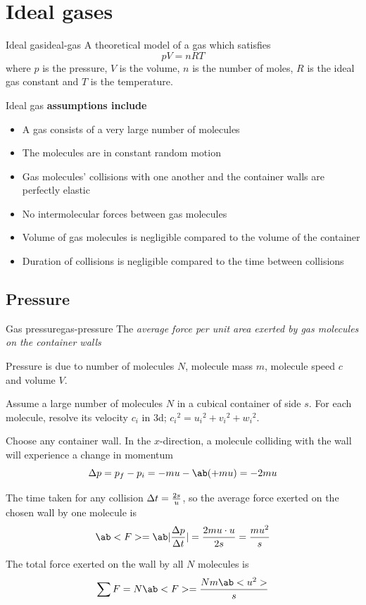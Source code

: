 \section{Ideal gases}
\begin{definition}{Ideal gas}{ideal-gas}
	A theoretical model of a gas which satisfies
	\[pV = nRT\]
	where \(p\) is the pressure, \(V\) is the volume, \(n\) is the number of moles, \(R\) is the ideal gas constant and \(T\) is the temperature.
\end{definition}
Ideal gas \bf{assumptions} include
\begin{itemize}
	\item A gas consists of a very large number of molecules
	\item The molecules are in constant random motion
	\item Gas molecules' collisions with one another and the container walls are perfectly elastic
	\item No intermolecular forces between gas molecules
	\item Volume of gas molecules is negligible compared to the volume of the container
	\item Duration of collisions is negligible compared to the time between collisions
\end{itemize}
\subsection{Pressure}
\begin{definition}{Gas pressure}{gas-pressure}
	The \it{average force per unit area} exerted by gas molecules on the container walls
\end{definition}
Pressure is due to number of molecules \(N\), molecule mass \(m\), molecule speed \(c\) and volume \(V\).

Assume a large number of molecules \(N\) in a cubical container of side \(s\).
For each molecule, resolve its velocity \(c_i\) in 3d; \({c_i}^2 = {u_i}^2 + {v_i}^2 + {w_i}^2\).

Choose any container wall. In the \(x\)-direction, a molecule colliding with the wall
will experience a change in momentum
\[\Delta p = p_f-p_i = -mu-\ab(+mu) = -2mu\]

The time taken for any collision \(\Delta t = \frac{2s}{u}\), so the average force exerted
on the chosen wall by one molecule is
\[\ab<F> = \ab|\f{\Delta p}{\Delta t}| = \f{2mu\cdot u}{2s} = \f{mu^2}{s}\]

The total force exerted on the wall by all \(N\) molecules is
\[\sum F = N\ab<F> = \f{Nm\ab<u^2>}{s}\]

